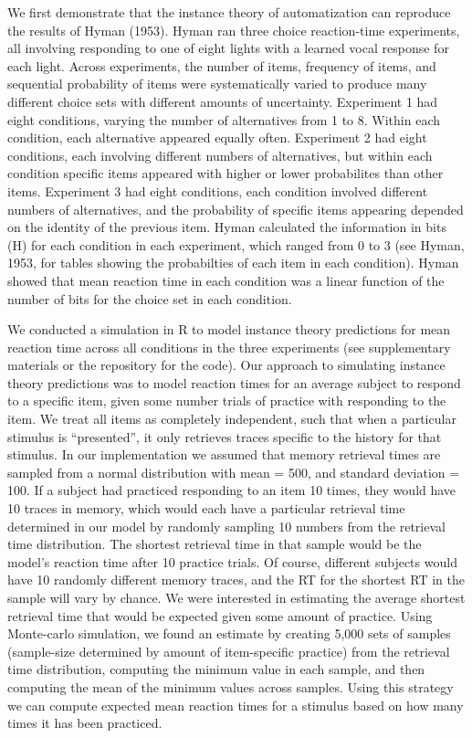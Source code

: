 \documentclass[,man,floatsintext]{apa6}
\begin{document}
We first demonstrate that the instance theory of automatization can reproduce the results of Hyman (1953). Hyman ran three choice reaction-time experiments, all involving responding to one of eight lights with a learned vocal response for each light. Across experiments, the number of items, frequency of items, and sequential probability of items were systematically varied to produce many different choice sets with different amounts of uncertainty. Experiment 1 had eight conditions, varying the number of alternatives from 1 to 8. Within each condition, each alternative appeared equally often. Experiment 2 had eight conditions, each involving different numbers of alternatives, but within each condition specific items appeared with higher or lower probabilites than other items. Experiment 3 had eight conditions, each condition involved different numbers of alternatives, and the probability of specific items appearing depended on the identity of the previous item. Hyman calculated the information in bits (H) for each condition in each experiment, which ranged from 0 to 3 (see Hyman, 1953, for tables showing the probabilties of each item in each condition). Hyman showed that mean reaction time in each condition was a linear function of the number of bits for the choice set in each condition.

We conducted a simulation in R to model instance theory predictions for mean reaction time across all conditions in the three experiments (see supplementary materials or the repository for the code). Our approach to simulating instance theory predictions was to model reaction times for an average subject to respond to a specific item, given some number trials of practice with responding to the item. We treat all items as completely independent, such that when a particular stimulus is \enquote{presented}, it only retrieves traces specific to the history for that stimulus. In our implementation we assumed that memory retrieval times are sampled from a normal distribution with mean = 500, and standard deviation = 100. If a subject had practiced responding to an item 10 times, they would have 10 traces in memory, which would each have a particular retrieval time determined in our model by randomly sampling 10 numbers from the retrieval time distribution. The shortest retrieval time in that sample would be the model's reaction time after 10 practice trials. Of course, different subjects would have 10 randomly different memory traces, and the RT for the shortest RT in the sample will vary by chance. We were interested in estimating the average shortest retrieval time that would be expected given some amount of practice. Using Monte-carlo simulation, we found an estimate by creating 5,000 sets of samples (sample-size determined by amount of item-specific practice) from the retrieval time distribution, computing the minimum value in each sample, and then computing the mean of the minimum values across samples. Using this strategy we can compute expected mean reaction times for a stimulus based on how many times it has been practiced.
\end{document}

